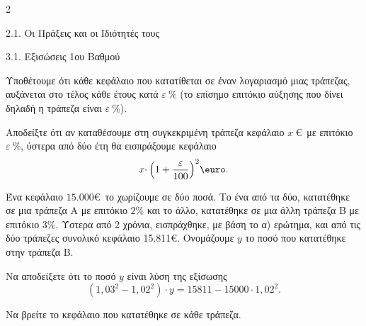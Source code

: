 \begin{ylh}{2}
    \item 2.1. Οι Πράξεις και οι Ιδιότητές τους
    \item 3.1. Εξισώσεις 1ου Βαθμού
\end{ylh}
Υποθέτουμε ότι κάθε κεφάλαιο που κατατίθεται σε έναν λογαριασμό μιας τράπεζας, αυξάνεται στο τέλος κάθε έτους κατά $\varepsilon\ \%$ (το επίσημο επιτόκιο αύξησης που δίνει δηλαδή η τράπεζα είναι $\varepsilon\ \%$).
\begin{alist}
\item Αποδείξτε ότι αν καταθέσουμε στη συγκεκριμένη τράπεζα κεφάλαιο $x\ $\euro\ με επιτόκιο $\varepsilon\ \%$, ύστερα από δύο έτη θα εισπράξουμε κεφάλαιο \[x{\cdot \left( 1 + \dfrac{\varepsilon}{100} \right)}^{2}\text{\euro}.\]
\item Ένα κεφάλαιο $15.000$\euro\ το χωρίζουμε σε δύο ποσά. Το ένα από τα δύο, κατατέθηκε σε μια τράπεζα Α με επιτόκιο $2\%$ και το άλλο, κατατέθηκε σε μια άλλη τράπεζα Β με επιτόκιο $3\%$. Ύστερα από 2 χρόνια, εισπράχθηκε, με βάση το α) ερώτημα, και από τις δύο τράπεζες συνολικό κεφάλαιο 15.811\euro. Ονομάζουμε $y$ το ποσό που κατατέθηκε στην τράπεζα Β.
\begin{rlist}
\item Να αποδείξετε ότι το ποσό $y$ είναι λύση της εξίσωσης
\[\left( {1,03}^{2} - {1,02}^{2} \right) \cdot y = 15811 - 15000 \cdot {1,02}^{2}.\] 
\item Να βρείτε το κεφάλαιο που κατατέθηκε σε κάθε τράπεζα.
\end{rlist}
\end{alist}


